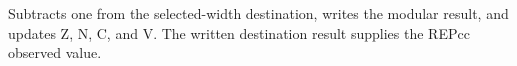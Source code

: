Subtracts one from the selected-width destination, writes the modular result, and updates Z, N, C, and V. The written destination result supplies the REPcc observed value.

